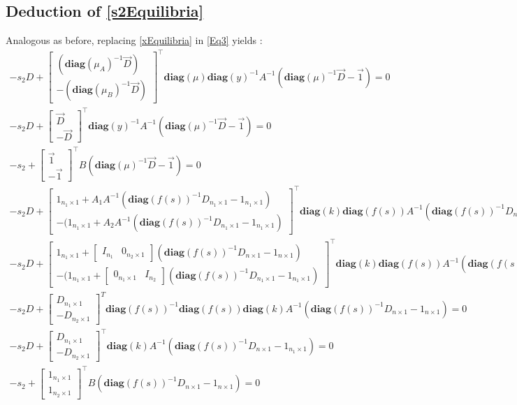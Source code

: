 \documentclass[3p,times]{article}
\newcommand{\diag}{\textbf{diag}}
\begin{document}
\subsection{Deduction of \eqref{s2Equilibria}}
Analogous as before, replacing \eqref{xEquilibria} in \eqref{Eq3} yields :
\begin{align}
-s_2D+
\begin{bmatrix}
(\diag(\mu_A)^{-1} \vec{D}) \\ -(\diag(\mu_B)^{-1} \vec{D})
\end{bmatrix}^\top \diag(\mu)\diag(y)^{-1} A^{-1}(\diag(\mu)^{-1}\vec{D}-\vec{1}) = 0 \\
-s_2D+
\begin{bmatrix}
\vec{D} \\ - \vec{D}
\end{bmatrix}^\top \diag(y)^{-1} A^{-1}(\diag(\mu)^{-1}\vec{D}-\vec{1}) = 0\\
-s_2+
\begin{bmatrix}
\vec{1} \\ - \vec{1}
\end{bmatrix}^\top B(\diag(\mu)^{-1}\vec{D}-\vec{1}) = 0
\end{align}
\begin{align} 
-s_2D+ \begin{bmatrix}
1_{n_1 \times 1}+A_1A^{-1}(\diag(f(s))^{-1}D_{n_1 \times 1}-1_{n_1 \times 1}) \\-(1_{n_1 \times 1}+A_2A^{-1}(\diag(f(s))^{-1}D_{n_1 \times 1}-1_{n_1 \times 1})
\end{bmatrix}^\top \diag(k)\diag(f(s))A^{-1}(\diag(f(s))^{-1}D_{n \times 1}-1_{n \times 1}) = 0 \\
-s_2D+	\begin{bmatrix}
1_{n_1 \times 1}+\begin{bmatrix}
I_{n_1} & 0_{n_2 \times 1} 
\end{bmatrix}(\diag(f(s))^{-1}D_{n \times 1}-1_{n \times 1}) \\-(1_{n_1 \times 1}+\begin{bmatrix}
0_{n_1 \times 1} & I_{n_2} 
\end{bmatrix}(\diag(f(s))^{-1}D_{n_1 \times 1}-1_{n_1 \times 1})
\end{bmatrix}^\top \diag(k)\diag(f(s))A^{-1}(\diag(f(s))^{-1}D_{n \times 1}-1_{n \times 1}) = 0 \\
-s_2D +	\begin{bmatrix}
D_{n_1 \times 1}\\-D_{n_2 \times 1}
\end{bmatrix}^T\diag(f(s))^{-1}\diag(f(s)) \diag(k) A^{-1}(\diag(f(s))^{-1}D_{n \times 1}-1_{n \times 1}) = 0  \\
-s_2D+\begin{bmatrix}
D_{n_1 \times 1} \\-D_{n_2\times 1}
\end{bmatrix}^\top \diag(k)A^{-1}(\diag(f(s))^{-1}D_{n \times 1}-1_{n_1 \times 1}) = 0 \\
-s_2 + \begin{bmatrix}
1_{n_1 \times 1}\\1_{n_2 \times 1}
\end{bmatrix}^\top B (\diag(f(s))^{-1}D_{n \times 1} - 1_{n \times 1}) = 0 
\end{align}
\end{document}

